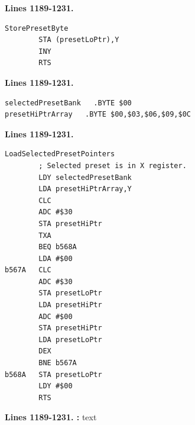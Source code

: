 \textbf{Lines 1189-1231. } 
\begin{lstlisting}
StorePresetByte
        STA (presetLoPtr),Y
        INY 
        RTS 

\end{lstlisting}

\textbf{Lines 1189-1231. } 
\begin{lstlisting}
selectedPresetBank   .BYTE $00
presetHiPtrArray   .BYTE $00,$03,$06,$09,$0C
\end{lstlisting}

\textbf{Lines 1189-1231. } 
\begin{lstlisting}
LoadSelectedPresetPointers
        ; Selected preset is in X register.
        LDY selectedPresetBank
        LDA presetHiPtrArray,Y
        CLC 
        ADC #$30
        STA presetHiPtr
        TXA 
        BEQ b568A
        LDA #$00
b567A   CLC 
        ADC #$30
        STA presetLoPtr
        LDA presetHiPtr
        ADC #$00
        STA presetHiPtr
        LDA presetLoPtr
        DEX 
        BNE b567A
b568A   STA presetLoPtr
        LDY #$00
        RTS 
\end{lstlisting}
\clearpage

\textbf{Lines 1189-1231. :} 
text


